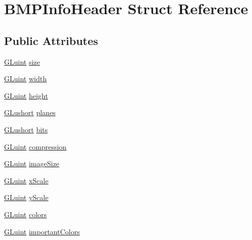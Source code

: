 \hypertarget{struct_b_m_p_info_header}{\section{B\-M\-P\-Info\-Header Struct Reference}
\label{struct_b_m_p_info_header}
}
\subsection*{Public Attributes}
\begin{DoxyCompactItemize}
\item 
\hyperlink{_g_l_e_w_2glew_8h_a68c4714e43d8e827d80759f9cb864f3c}{G\-Luint} \hyperlink{struct_b_m_p_info_header_ad00b1bd31f6235d5a083179a74267cbe}{size}
\item 
\hyperlink{_g_l_e_w_2glew_8h_a68c4714e43d8e827d80759f9cb864f3c}{G\-Luint} \hyperlink{struct_b_m_p_info_header_af32290c3171c40da6914892acf83112d}{width}
\item 
\hyperlink{_g_l_e_w_2glew_8h_a68c4714e43d8e827d80759f9cb864f3c}{G\-Luint} \hyperlink{struct_b_m_p_info_header_ac5656981494fd88d7c6ae595aa689404}{height}
\item 
\hyperlink{_g_l_e_w_2glew_8h_ac995a558f6571eb5f98b7a6d2b2a4468}{G\-Lushort} \hyperlink{struct_b_m_p_info_header_a1697f773d6987a7ee3c387e3d406e116}{planes}
\item 
\hyperlink{_g_l_e_w_2glew_8h_ac995a558f6571eb5f98b7a6d2b2a4468}{G\-Lushort} \hyperlink{struct_b_m_p_info_header_a5bd5ab54dce4b58605045f6d589b90a5}{bits}
\item 
\hyperlink{_g_l_e_w_2glew_8h_a68c4714e43d8e827d80759f9cb864f3c}{G\-Luint} \hyperlink{struct_b_m_p_info_header_aeede45b0f3a62e77ff76a1a7de95bd70}{compression}
\item 
\hyperlink{_g_l_e_w_2glew_8h_a68c4714e43d8e827d80759f9cb864f3c}{G\-Luint} \hyperlink{struct_b_m_p_info_header_a57b5db1e977e7243caf692c9ead8db2e}{image\-Size}
\item 
\hyperlink{_g_l_e_w_2glew_8h_a68c4714e43d8e827d80759f9cb864f3c}{G\-Luint} \hyperlink{struct_b_m_p_info_header_a6635a48d388d6b71486f7be87bdcb425}{x\-Scale}
\item 
\hyperlink{_g_l_e_w_2glew_8h_a68c4714e43d8e827d80759f9cb864f3c}{G\-Luint} \hyperlink{struct_b_m_p_info_header_a210749e24d5ce5eb1936b5e8882123dd}{y\-Scale}
\item 
\hyperlink{_g_l_e_w_2glew_8h_a68c4714e43d8e827d80759f9cb864f3c}{G\-Luint} \hyperlink{struct_b_m_p_info_header_a34f22ee438538f852f0c0c9e93939d1a}{colors}
\item 
\hyperlink{_g_l_e_w_2glew_8h_a68c4714e43d8e827d80759f9cb864f3c}{G\-Luint} \hyperlink{struct_b_m_p_info_header_a35e2f798242ca4e2c68fa4bef9d14cbc}{important\-Colors}
\end{DoxyCompactItemize}


